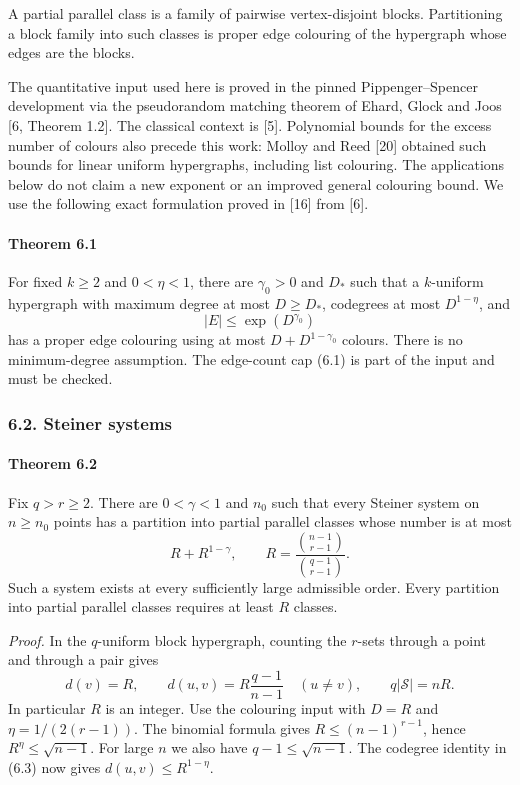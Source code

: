 \documentclass[english,11pt,a4paper]{article}
\begin{document}
A partial parallel class is a family of pairwise vertex-disjoint blocks. Partitioning a block family into such classes is proper edge colouring of the hypergraph whose edges are the blocks.

The quantitative input used here is proved in the pinned Pippenger--Spencer development via the pseudorandom matching theorem of Ehard, Glock and Joos {[}6, Theorem 1.2{]}. The classical context is {[}5{]}. Polynomial bounds for the excess number of colours also precede this work: Molloy and Reed {[}20{]} obtained such bounds for linear uniform hypergraphs, including list colouring. The applications below do not claim a new exponent or an improved general colouring bound. We use the following exact formulation proved in {[}16{]} from {[}6{]}.

\par
\begin{samepage}
\paragraph{Theorem 6.1}\label{theorem-6.1}

For fixed \(k\ge2\) and \(0<\eta<1\), there are \(\gamma_0>0\) and \(D_*\) such that a \(k\)-uniform hypergraph with maximum degree at most \(D\ge D_*\), codegrees at most \(D^{1-\eta}\), and \[|E|\le\exp(D^{\gamma_0})
\tag{6.1}\] has a proper edge colouring using at most \(D+D^{1-\gamma_0}\) colours. There is no minimum-degree assumption. The edge-count cap (6.1) is part of the input and must be checked.


\end{samepage}
\subsubsection{6.2. Steiner systems}\label{steiner-systems}

\par
\begin{samepage}
\paragraph{Theorem 6.2}\label{theorem-6.2}

Fix \(q>r\ge2\). There are \(0<\gamma<1\) and \(n_0\) such that every Steiner system on \(n\ge n_0\) points has a partition into partial parallel classes whose number is at most \[R+R^{1-\gamma},\qquad
R=\frac{\binom{n-1}{r-1}}{\binom{q-1}{r-1}}.
\tag{6.2}\] Such a system exists at every sufficiently large admissible order. Every partition into partial parallel classes requires at least \(R\) classes.

\end{samepage}
\emph{Proof.} In the \(q\)-uniform block hypergraph, counting the \(r\)-sets through a point and through a pair gives \[d(v)=R,\qquad
d(u,v)=R\frac{q-1}{n-1}\quad(u\ne v),\qquad
q|\mathcal S|=nR.
\tag{6.3}\] In particular \(R\) is an integer. Use the colouring input with \(D=R\) and \(\eta=1/(2(r-1))\). The binomial formula gives \(R\le(n-1)^{r-1}\), hence \(R^\eta\le\sqrt{n-1}\). For large \(n\) we also have \(q-1\le\sqrt{n-1}\). The codegree identity in (6.3) now gives \(d(u,v)\le R^{1-\eta}\).
\end{document}
